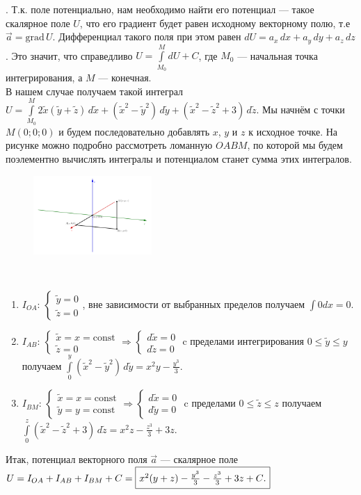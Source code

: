\documentclass[a3paper,14pt]{extarticle}
\newcommand*\squared[1]{\tikz[baseline=(char.base)]{
            \node[shape=rectangle,draw,inner sep=4pt] (char) {#1};}}
\begin{document}
\pagebreak{}. Т.к. поле потенциально, нам необходимо найти его потенциал --- такое скалярное поле $U$, что его градиент будет равен исходному векторному полю, т.е $\vec{a} = \text{grad}\,U$. Дифференциал такого поля при этом равен $dU = a_x\,dx + a_y\,dy + a_z\,dz$. Это значит, что справедливо $U = \int\limits_{M_0}^M dU + C$, где $M_0$ --- начальная точка интегрирования, а $M$ --- конечная.\\[0.5em]
В нашем случае получаем такой интеграл $U = \int\limits_{M_0}^M 2\tilde{x}(\tilde{y}+\tilde{z})\,d\tilde{x} + (\tilde{x}^2-\tilde{y}^2)\,d\tilde{y} + (\tilde{x}^2-\tilde{z}^2+3)\,d\tilde{z}$. Мы начнём с точки $M(0; 0; 0)$ и будем последовательно добавлять $x$, $y$ и $z$ к исходное точке. На рисунке можно подробно рассмотреть ломанную $OABM$, по которой мы будем поэлементно вычислять интегралы и потенциалом станет сумма этих интегралов.
\begin{figure}[h]
    \centering\includegraphics[width=0.4\textwidth]{6.png}
\end{figure} \,\\[1em]
\begin{enumerate}
    \item $I_{OA}$: $\begin{cases}
        \tilde{y} = 0 \\ \tilde{z} = 0
    \end{cases}$, вне зависимости от выбранных пределов получаем $\int 0dx = 0$.
    \item $I_{AB}$: $\begin{cases}
        \tilde{x} = x = \text{const} \\ \tilde{z} = 0
    \end{cases} \Rightarrow \begin{cases}
        d\tilde{x} = 0 \\ d\tilde{z} = 0
    \end{cases}$ c пределами интегрирования $0 \le \tilde{y} \le y$ получаем $\int\limits_0^y (\tilde{x}^2-\tilde{y}^2)\,d\tilde{y} = x^2y - \frac{y^3}{3}$.
    \item $I_{BM}$: $\begin{cases}
        \tilde{x} = x = \text{const} \\ \tilde{y} = y = \text{const}
    \end{cases} \Rightarrow \begin{cases}
        d\tilde{x} = 0 \\ d\tilde{y} = 0
    \end{cases}$ c пределами $0 \le \tilde{z} \le z$ получаем $\int\limits_0^z (\tilde{x}^2-\tilde{z}^2+3)\,d\tilde{z} = x^2z - \frac{z^3}{3}+3z$.
\end{enumerate}
Итак, потенциал векторного поля $\vec{a}$ --- скалярное поле $U = I_{OA} + I_{AB} + I_{BM} + C = \squared{$x^2(y + z) - \frac{y^3}{3} - \frac{z^3}{3} + 3z + C$.}$
\end{document}
